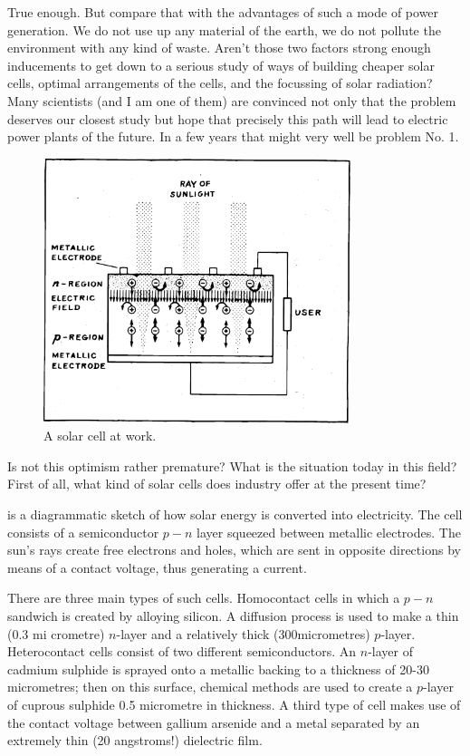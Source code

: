 True enough. But compare that with the advantages of such a mode of power generation. We do not use up any material of the earth, we do not pollute the environment with any kind of waste. Aren't those two factors strong enough inducements to get down to a serious study of ways of building cheaper solar cells, optimal arrange­ments of the cells, and the focussing of solar radiation? Many scientists (and I am one of them) are convinced not only that the problem deserves our closest study but hope that precisely this path will lead to electric power plants of the future. In a few years that might very well be problem No. 1.
\begin{figure}[!ht]
\centering
\includegraphics[width=0.8\textwidth]{figures/fig-06-04.pdf}
\caption{A solar cell at work.}
\label{fig-6.4}
\end{figure}

Is not this optimism rather premature? What is the situation today in this field? First of all, what kind of solar cells does industry offer at the present time? 

 is a diagrammatic sketch of how solar energy is converted into electricity. The cell consists of a semiconductor $p\!-\!n$ layer squeezed between metallic elec­trodes. The sun's rays create free electrons and holes, which are sent in opposite directions by means of a contact voltage, thus generating a current.

There are three main types of such cells. Homocontact cells in which a $p\!-\!n$ sandwich is created by alloying silicon. A diffusion process is used to make a thin (0.3 mi­ crometre) $n$-layer and a relatively thick (300micrometres) $p$-layer. Heterocontact cells consist of two different semiconductors. An $n$-layer of cadmium sulphide is sprayed onto a metallic backing to a thickness of 20-30 micro­metres; then on this surface, chemical methods are used to create a $p$-layer of cuprous sulphide 0.5 micrometre in thickness. A third type of cell makes use of the contact voltage between gallium arsenide and a metal separated by an extremely thin (20 angstroms!) dielectric film.

